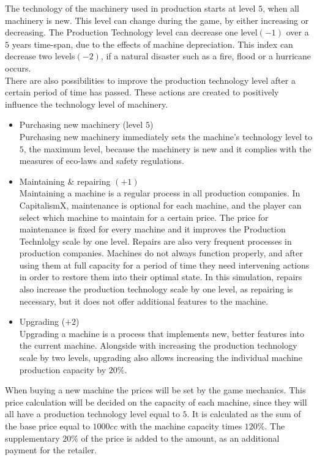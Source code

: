 The technology of the machinery used in production starts at level $5$, when all machinery is new. This level can change during the game, by either increasing or decreasing. The Production Technology level can decrease one level$(-1)$ over a $5$ years time-span, due to the effects of machine depreciation. This index can decrease two levels$(-2)$, if a natural disaster such as a fire, flood or a hurricane occurs.\\
There are also possibilities to improve the production technology level after a certain period of time has passed. These actions are created to  positively influence the technology level of machinery.
\begin{itemize}
    \item Purchasing new machinery (level $5$) \\
		Purchasing new machinery immediately sets the machine's technology level to $5$, the maximum level, because the machinery is new and it complies with the measures of eco-laws and safety regulations.
\item Maintaining \& repairing $(+1)$ \\
Maintaining a machine is a regular process in all production companies. In CapitalismX, maintenance is optional for each machine, and the player can select which machine to maintain for a certain price. The price for maintenance is fixed for every machine and it improves the Production Technlolgy scale by one level. 
Repairs are also very frequent processes in production companies. Machines do not always function properly, and after using them at full capacity for a period of time they need intervening actions in order to restore them into their optimal state. In this simulation, repairs also increase the production technology scale by one level, as repairing is necessary, but it does not offer additional features to the machine.
\item Upgrading ($+2$) \\
Upgrading a machine is a process that implements new, better features into the current machine. Alongside with increasing the production technology scale by two levels, upgrading also allows increasing the individual machine production capacity by $20\%$.
\end{itemize}
When buying a new machine the prices will be set by the game mechanics. This price calculation will be decided on the capacity of each machine, since they will all have a production technology level equal to $5$. It is calculated as the sum of the base price equal to $1000cc$ with the machine capacity times $120\%$.  The supplementary $20\%$ of the price is added to the amount, as an additional payment for the retailer.
